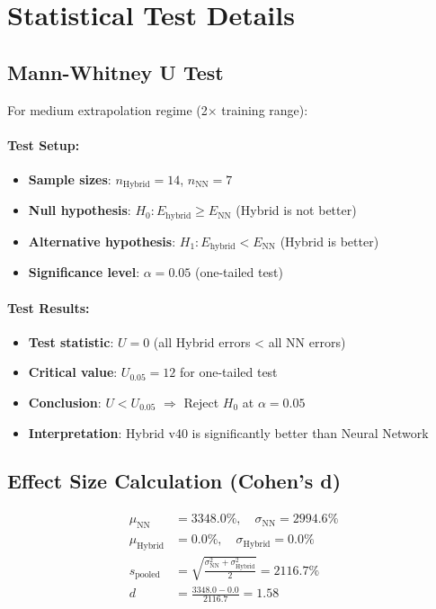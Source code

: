 
\section{Statistical Test Details}
\label{app:statistical_tests}

\subsection{Mann-Whitney U Test}

For medium extrapolation regime (2$\times$ training range):

\paragraph{Test Setup:}
\begin{itemize}
\item \textbf{Sample sizes}: $n_{\text{Hybrid}} = 14$, $n_{\text{NN}} = 7$
\item \textbf{Null hypothesis}: $H_0: E_{\text{hybrid}} \geq E_{\text{NN}}$ (Hybrid is not better)
\item \textbf{Alternative hypothesis}: $H_1: E_{\text{hybrid}} < E_{\text{NN}}$ (Hybrid is better)
\item \textbf{Significance level}: $\alpha = 0.05$ (one-tailed test)
\end{itemize}

\paragraph{Test Results:}
\begin{itemize}
\item \textbf{Test statistic}: $U = 0$ (all Hybrid errors < all NN errors)
\item \textbf{Critical value}: $U_{0.05} = 12$ for one-tailed test
\item \textbf{Conclusion}: $U < U_{0.05}$ $\Rightarrow$ Reject $H_0$ at $\alpha = 0.05$
\item \textbf{Interpretation}: Hybrid v40 is significantly better than Neural Network
\end{itemize}

\subsection{Effect Size Calculation (Cohen's d)}

\begin{align}
\mu_{\text{NN}} &= 3348.0\%, \quad \sigma_{\text{NN}} = 2994.6\% \\
\mu_{\text{Hybrid}} &= 0.0\%, \quad \sigma_{\text{Hybrid}} = 0.0\% \\
s_{\text{pooled}} &= \sqrt{\frac{\sigma_{\text{NN}}^2 + \sigma_{\text{Hybrid}}^2}{2}} = 2116.7\% \\
d &= \frac{3348.0 - 0.0}{2116.7} = 1.58
\end{align}

